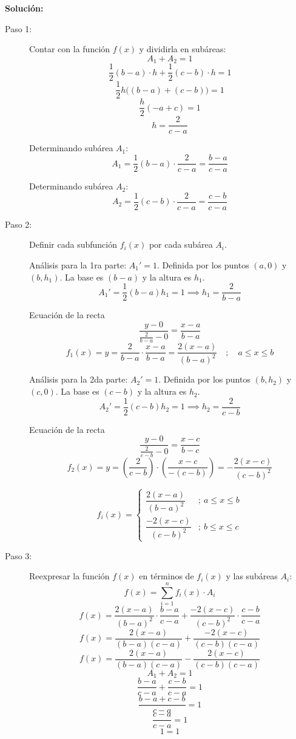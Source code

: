 \documentclass{article}
\begin{document}
\textbf{Solución:}
\begin{description}
    \item[Paso 1:] Contar con la función $f(x)$ y dividirla en subáreas:
    $$ A_1 + A_2 = 1 $$
    $$ \frac{1}{2}(b-a) \cdot h + \frac{1}{2}(c-b) \cdot h = 1 $$
    $$ \frac{1}{2}h\big((b-a)+(c-b)\big) = 1 $$
    $$ \frac{h}{2}(-a+c) = 1 $$
    $$ h = \frac{2}{c-a} $$

    Determinando subárea $A_1$:
    $$ A_1 = \frac{1}{2}(b-a) \cdot \frac{2}{c-a} = \frac{b-a}{c-a} $$

    Determinando subárea $A_2$:
    $$ A_2 = \frac{1}{2}(c-b) \cdot \frac{2}{c-a} = \frac{c-b}{c-a} $$

\item[Paso 2:] Definir cada subfunción $f_i(x)$ por cada subárea $A_i$.

    Análisis para la 1ra parte: $A_1'=1$. Definida por los puntos $(a, 0)$ y $(b, h_1)$.
    La base es $(b-a)$ y la altura es $h_1$.
    $$ A_1' = \frac{1}{2}(b-a)h_1 = 1 \implies h_1 = \frac{2}{b-a} $$
    
    Ecuación de la recta
    $$ \frac{y - 0}{\frac{2}{b-a} - 0} = \frac{x - a}{b - a} $$
    $$ f_1(x) = y = \frac{2}{b-a} \cdot \frac{x - a}{b - a} = \frac{2(x-a)}{(b-a)^2} \quad ; \quad a \leq x \leq b $$

    Análisis para la 2da parte: $A_2'=1$. Definida por los puntos $(b, h_2)$ y $(c, 0)$.
    La base es $(c-b)$ y la altura es $h_2$.
    $$ A_2' = \frac{1}{2}(c-b)h_2 = 1 \implies h_2 = \frac{2}{c-b} $$
    
    Ecuación de la recta
    $$ \frac{y - 0}{\frac{2}{c-b} - 0} = \frac{x - c}{b - c} $$
    $$ f_2(x) = y = \left( \frac{2}{c-b} \right) \cdot \left( \frac{x - c}{-(c - b)} \right) = - \frac{2(x - c)}{(c - b)^2} $$

    \begin{equation}
    f_i(x) = \begin{cases} 
    \dfrac{2(x-a)}{(b-a)^2} &;\ a \leq x \leq b \\[15pt]
    \dfrac{-2(x-c)}{(c-b)^2} &;\ b \leq x \leq c 
    \end{cases}
    \end{equation}
    
    \item[Paso 3:] Reexpresar la función $f(x)$ en términos de $f_i(x)$ y las subáreas $A_i$:
    $$ f(x) = \sum_{i=1}^{n} f_i(x) \cdot A_i $$
    $$ f(x) = \frac{2(x-a)}{(b-a)^2} \cdot \frac{b-a}{c-a} + \frac{-2(x-c)}{(c-b)^2} \cdot \frac{c-b}{c-a} $$
    $$ f(x) = \frac{2(x-a)}{(b-a)(c-a)} + \frac{-2(x-c)}{(c-b)(c-a)} $$
    $$ f(x) = \frac{2(x-a)}{(b-a)(c-a)} - \frac{2(x-c)}{(c-b)(c-a)} $$
    $$ A_1 + A_2 = 1 $$
    $$ \frac{b-a}{c-a} + \frac{c-b}{c-a} = 1 $$
    $$ \frac{b-a+c-b}{c-a} = 1 $$
    $$ \frac{c-a}{c-a} = 1 $$
    $$ 1 = 1 $$


\end{description}
\end{document}
